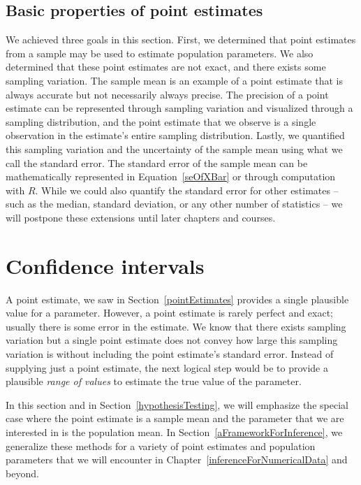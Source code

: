 \subsection{Basic properties of point estimates}

We achieved three goals in this section. First, we determined that point estimates from a sample may be used to estimate population parameters. We also determined that these point estimates are not exact, and there exists some sampling variation. The sample mean is an example of a point estimate that is always accurate but not necessarily always precise. The precision of a point estimate can be represented through sampling variation and visualized through a sampling distribution, and the point estimate that we observe is a single observation in the estimate's entire sampling distribution. Lastly, we quantified this sampling variation and the uncertainty of the sample mean using what we call the standard error. The standard error of the sample mean can be mathematically represented in Equation~\eqref{seOfXBar} or through computation with $R$. While we could also quantify the standard error for other estimates -- such as the median, standard deviation, or any other number of statistics -- we will postpone these extensions until later chapters and courses.


\section{Confidence intervals}
\label{confidenceIntervals}


A point estimate, we saw in Section~\ref{pointEstimates} provides a single plausible value for a parameter. However, a point estimate is rarely perfect and exact; usually there is some error in the estimate. We know that there exists sampling variation but a single point estimate does not convey how large this sampling variation is without including the point estimate's standard error. Instead of supplying just a point estimate, the next logical step would be to provide a plausible \emph{range of values} to estimate the true value of the parameter.

In this section and in Section~\ref{hypothesisTesting}, we will emphasize the special case where the point estimate is a sample mean and the parameter that we are interested in is the population mean. In Section~\ref{aFrameworkForInference}, we generalize these methods for a variety of point estimates and population parameters that we will encounter in Chapter~\ref{inferenceForNumericalData} and beyond.

